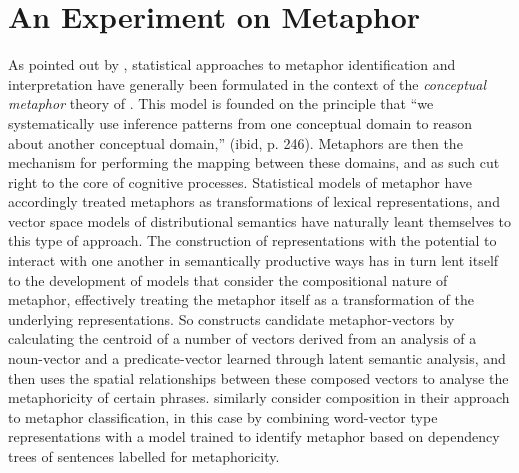 \section{An Experiment on Metaphor} \label{sec:metperiment}
As pointed out by \cite{ShutovaEA2013}, statistical approaches to metaphor identification and interpretation have generally been formulated in the context of the \emph{conceptual metaphor} theory of \cite{LakoffEA2003}.  This model is founded on the principle that ``we systematically use inference patterns from one conceptual domain to reason about another conceptual domain,'' (ibid, p. 246).  Metaphors are then the mechanism for performing the mapping between these domains, and as such cut right to the core of cognitive processes.  Statistical models of metaphor have accordingly treated metaphors as transformations of lexical representations, and vector space models of distributional semantics have naturally leant themselves to this type of approach.  The construction of representations with the potential to interact with one another in semantically productive ways has in turn lent itself to the development of models that consider the compositional nature of metaphor, effectively treating the metaphor itself as a transformation of the underlying representations.  So \cite{Utsumi2011} constructs candidate metaphor-vectors by calculating the centroid of a number of vectors derived from an analysis of a noun-vector and a predicate-vector learned through latent semantic analysis, and then uses the spatial relationships between these composed vectors to analyse the metaphoricity of certain phrases.  \cite{HovyEA2013} similarly consider composition in their approach to metaphor classification, in this case by combining word-vector type representations with a model trained to identify metaphor based on dependency trees of sentences labelled for metaphoricity.

